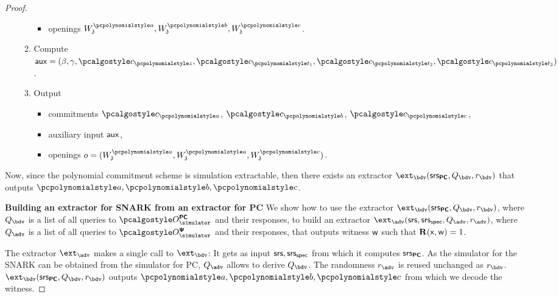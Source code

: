 \documentclass[runningheads,11pt]{llncs}
\begin{document}
\begin{proof}
\begin{enumerate}
\begin{enumerate}
\begin{itemize}
      \item openings $W_\chz^{\p{a}}, W_\chz^{\p{b}}, W_\chz^{\p{c}}$.
      \end{itemize}
    \item Compute
      $\aux = (\beta, \gamma, \cp{z}, \cp{t_1},
      \cp{t_2}, \cp{t_3})$.
    \item Output
      \begin{itemize}
      \item commitments $\cp{a}$, $\cp{b}$, $\cp{c}$,
      \item auxiliary input $\mathsf{aux}$,
      \item openings $o = (W_\chz^{\p{a}}, W_\chz^{\p{a}},  W_\chz^{\p{c}})$.
      \end{itemize}
    \end{enumerate}
  \end{enumerate}

  Now, since the polynomial commitment scheme is simulation
  extractable, then there exists an extractor
  $\ext_{\bdv}(\srs_{\PCOM}, \qbdv, \rbdv)$ that outputs $\p{a}, \p{b}, \p{c}$.\smallskip

\noindent\textbf{Building an extractor for SNARK from an extractor for PC}
  We show how to use the extractor
  $\ext_\bdv(\srs_{\PCOM}, \qbdv, \rbdv)$, where $\qbdv$ is a list of all
  queries to $\oraclespcom$ and their responses, to build an extractor
  $\ext_\adv(\srs, \srss, \qadv, \radv)$, where $\qadv$ is a list of all queries
  to $\oraclesps$ and their responses, that outputs witness $\mathsf{w}$ such that
  $\mathbf{R}(\mathsf{x}, \mathsf{w}) = 1$.


  The extractor $\ext_\adv$ makes a single call to
  $\ext_{\bdv}$: It gets as input $\mathsf{srs}, \mathsf{srs_{spec}}$ from which it computes
  $\mathsf{srs}_{{\bm{\mathsf{PC}}}}$. As the simulator for the SNARK can be obtained from the simulator for PC, $\qadv$ allows to derive $\qbdv$.  The
  randomness $\radv$ is reused unchanged as $\rbdv$.
  $\ext_{\bdv}(\srs_{\PCOM}, \qbdv, \rbdv)$ outputs $\p{a}, \p{b}, \p{c}$ from
  which we decode the witness.

\end{proof}
\end{document}
